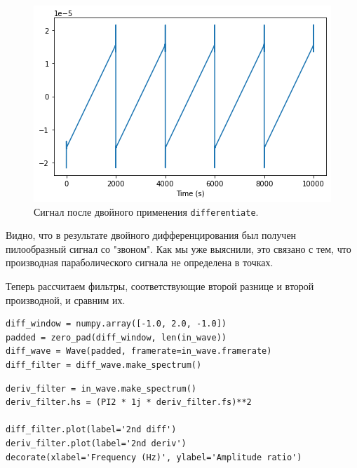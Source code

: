 \documentclass[a4paper, 14pt]{extarticle}
\begin{document}
    \begin{figure}[H]
        \centering
        \includegraphics[width=0.8\linewidth]{resources/Images/task5_out_differentiate}
        \caption{Сигнал после двойного применения \texttt{differentiate}.}
        \label{fig:task5_out_differentiate}
    \end{figure}

    Видно, что в результате двойного дифференцирования был получен пилообразный сигнал со "звоном".
    Как мы уже выяснили, это связано с тем, что производная параболического сигнала не определена в точках.

    Теперь рассчитаем фильтры, соответствующие второй разнице и второй производной, и сравним их.

    \begin{lstlisting}[caption= Вычисление фильтра для второй разности., label={lst:task5_diff_filter}]
diff_window = numpy.array([-1.0, 2.0, -1.0])
padded = zero_pad(diff_window, len(in_wave))
diff_wave = Wave(padded, framerate=in_wave.framerate)
diff_filter = diff_wave.make_spectrum()     \end{lstlisting}

    \begin{lstlisting}[caption= Вычисление фильтра для второй производной и сравнение фильтров., label={lst:task5_deriv_filter}]
deriv_filter = in_wave.make_spectrum()
deriv_filter.hs = (PI2 * 1j * deriv_filter.fs)**2

diff_filter.plot(label='2nd diff')
deriv_filter.plot(label='2nd deriv')
decorate(xlabel='Frequency (Hz)', ylabel='Amplitude ratio')     \end{lstlisting}
\end{document}
